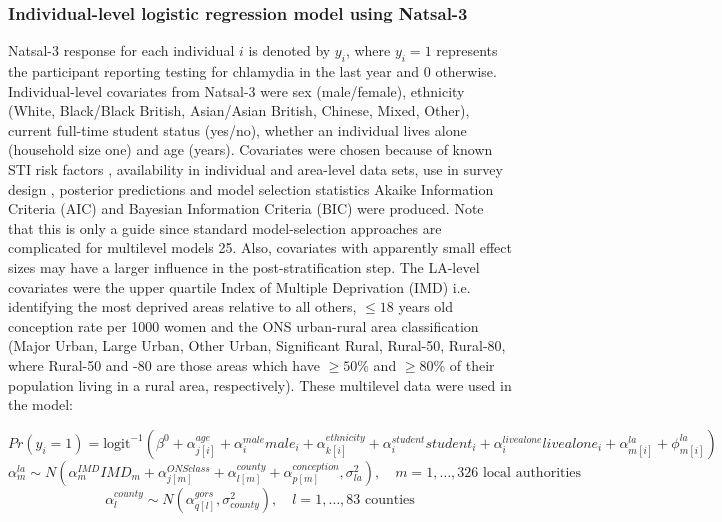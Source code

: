 \documentclass[fleqn,10pt]{wlscirep}
\begin{document}
\subsubsection*{Individual-level logistic regression model using Natsal-3}
Natsal-3 response for each individual $i$ is denoted by $y_i$, where $y_i = 1$ represents the participant reporting testing for chlamydia in the last year and 0 otherwise. 
Individual-level covariates from Natsal-3 were sex (male/female), ethnicity (White, Black/Black British, Asian/Asian British, Chinese, Mixed, Other), current full-time student status (yes/no), whether an individual lives alone (household size one) and age (years). Covariates were chosen because of known STI risk factors \cite{Waroux2014}, availability in individual and area-level data sets, use in survey design \cite{Erens2013}, posterior predictions and model selection statistics Akaike Information Criteria (AIC) and Bayesian Information Criteria (BIC) \cite{Molenberghs2016} were produced. Note that this is only a guide since standard model-selection approaches are complicated for multilevel models 25. Also, covariates with apparently small effect sizes may have a larger influence in the post-stratification step.
The LA-level covariates were the upper quartile Index of Multiple Deprivation (IMD) i.e. identifying the most deprived areas relative to all others, $\leq 18$ years old conception rate per 1000 women and the ONS urban-rural area classification (Major Urban, Large Urban, Other Urban, Significant Rural, Rural-50, Rural-80, where Rural-50 and -80 are those areas which have $\geq 50$\% and $\geq 80$\% of their population living in a rural area, respectively). 
These multilevel data were used in the model:

\begin{displaymath}
Pr(y_i = 1) = \mbox{logit}^{-1} \left( \beta^0 + \alpha_{j[i]}^{age} + \alpha_i^{male} male_i + \alpha_{k[i]}^{ethnicity} + \alpha_i^{student} student_i + \alpha_i^{livealone} livealone_i + \alpha_{m[i]}^{la} + \phi_{m[i]}^{la} \right)
\end{displaymath}
\begin{displaymath}
\alpha_m^{la} \sim N \left( \alpha_m^{IMD} IMD_m + \alpha_{j[m]}^{ONSclass} + \alpha_{l[m]}^{county} + \alpha_{p[m]}^{conception}, \sigma_{la}^2 \right), \quad m = 1,\ldots, 326 \mbox{ local authorities}
\end{displaymath}
\begin{displaymath}
\alpha_l^{county} \sim N \left( \alpha_{q[l]}^{gors}, \sigma_{county}^2 \right), \quad l = 1, \ldots, 83 \mbox{ counties}
\end{displaymath}
\end{document}
